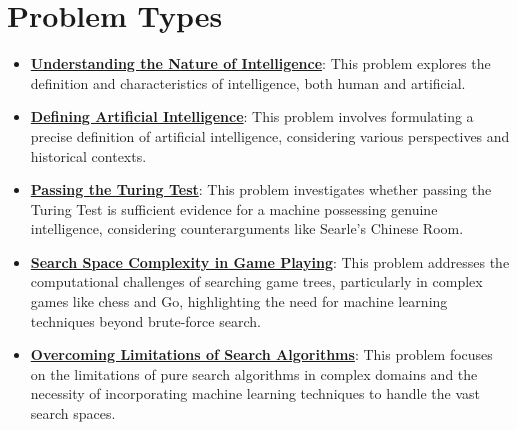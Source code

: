 \documentclass{article}%
\begin{document}
\section{Problem Types}%
\label{sec:ProblemTypes}%
\begin{itemize}[leftmargin=*]%
\item \href{https://purdue.brightspace.com/d2l/common/assets/pdfjs-d2l-dist/1.0.14-legacy/web/viewer.html?file=\%2Fcontent\%2Fenforced\%2F1095467-wl.202510.CS.24300.001\%2F02L2-Intro.pdf\%3Fou\%3D1095467\&lang=en-us\&container=d2l-fileviewer-rendered-pdf\&fullscreen=d2l-fileviewer-rendered-pdf-dialog\&height=667#page=3}{\textbf{Understanding the Nature of Intelligence}}: This problem explores the definition and characteristics of intelligence, both human and artificial.%
\item \href{https://purdue.brightspace.com/d2l/common/assets/pdfjs-d2l-dist/1.0.14-legacy/web/viewer.html?file=\%2Fcontent\%2Fenforced\%2F1095467-wl.202510.CS.24300.001\%2F02L2-Intro.pdf\%3Fou\%3D1095467\&lang=en-us\&container=d2l-fileviewer-rendered-pdf\&fullscreen=d2l-fileviewer-rendered-pdf-dialog\&height=667#page=5}{\textbf{Defining Artificial Intelligence}}: This problem involves formulating a precise definition of artificial intelligence, considering various perspectives and historical contexts.%
\item \href{https://purdue.brightspace.com/d2l/common/assets/pdfjs-d2l-dist/1.0.14-legacy/web/viewer.html?file=\%2Fcontent\%2Fenforced\%2F1095467-wl.202510.CS.24300.001\%2F02L2-Intro.pdf\%3Fou\%3D1095467\&lang=en-us\&container=d2l-fileviewer-rendered-pdf\&fullscreen=d2l-fileviewer-rendered-pdf-dialog\&height=667#page=6}{\textbf{Passing the Turing Test}}: This problem investigates whether passing the Turing Test is sufficient evidence for a machine possessing genuine intelligence, considering counterarguments like Searle's Chinese Room.%
\item \href{https://purdue.brightspace.com/d2l/common/assets/pdfjs-d2l-dist/1.0.14-legacy/web/viewer.html?file=\%2Fcontent\%2Fenforced\%2F1095467-wl.202510.CS.24300.001\%2F02L2-Intro.pdf\%3Fou\%3D1095467\&lang=en-us\&container=d2l-fileviewer-rendered-pdf\&fullscreen=d2l-fileviewer-rendered-pdf-dialog\&height=667#page=11}{\textbf{Search Space Complexity in Game Playing}}: This problem addresses the computational challenges of searching game trees, particularly in complex games like chess and Go, highlighting the need for machine learning techniques beyond brute{-}force search.%
\item \href{https://purdue.brightspace.com/d2l/common/assets/pdfjs-d2l-dist/1.0.14-legacy/web/viewer.html?file=\%2Fcontent\%2Fenforced\%2F1095467-wl.202510.CS.24300.001\%2F02L2-Intro.pdf\%3Fou\%3D1095467\&lang=en-us\&container=d2l-fileviewer-rendered-pdf\&fullscreen=d2l-fileviewer-rendered-pdf-dialog\&height=667#page=12}{\textbf{Overcoming Limitations of Search Algorithms}}: This problem focuses on the limitations of pure search algorithms in complex domains and the necessity of incorporating machine learning techniques to handle the vast search spaces.%

\end{itemize}
\end{document}
